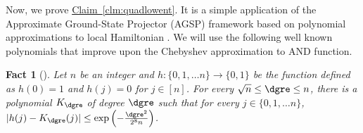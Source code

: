 \documentclass[11pt]{article}
\newcommand{\expref}[2]{\texorpdfstring{\hyperref[#2]{#1~\ref{#2}}}{#1~\ref{#2}}}
\newtheorem{fact}[theorem]{Fact}
\begin{document}
Now, we prove \expref{Claim}{clm:quadlowent}. It is a simple application of the Approximate Ground-State Projector (AGSP) framework based on polynomial approximations to local Hamiltonian \cite{AradKLV13}. We will use the following well known polynomials that improve upon the Chebyshev approximation to AND function.

\begin{fact}[\cite{KahnLS96, BuhrmanCWZ99}]
\label{fact:KLS} Let $n$ be an integer and $h:\{0,1,\ldots n\}\rightarrow \{0,1\}$ be the function defined as $h(0)=1$ and $h(j)=0$ for $j\in [n]$. For every $\sqrt{n}\leq \dgre \leq n$, there is a polynomial $K_{\dgre}$ of degree $\dgre$ such that for every $j\in \{0,1,\ldots n\}$,  $|h(j)-K_{\dgre}(j)|\leq \exp\left(-\frac{\dgre^2}{2^8n}\right)$.
\end{fact}
\end{document}
